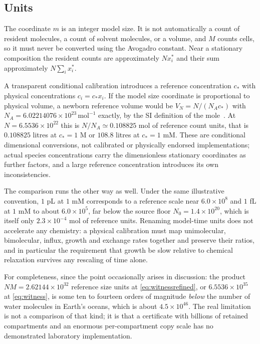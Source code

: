 \documentclass[11pt,a4paper]{article}
\theoremstyle{plain}
\theoremstyle{definition}
\theoremstyle{remark}
\begin{document}
\subsection{Units}\label{sec:units}

The coordinate $m$ is an integer model size. It is not automatically a count of
resident molecules, a count of solvent molecules, or a volume, and $M$ counts
cells, so it must never be converted using the Avogadro constant. Near a
stationary composition the resident counts are approximately $Nx_i^*$ and their
sum approximately $N\sum_ix_i^*$.

A transparent conditional calibration introduces a reference concentration
$c_*$ with physical concentrations $c_i=c_*x_i$. If the model size coordinate
is proportional to physical volume, a newborn reference volume would be
$V_N=N/(N_Ac_*)$ with $N_A=6.02214076\times10^{23}\,\mathrm{mol}^{-1}$ exactly,
by the SI definition of the mole~\citep{bipm2019}. At $N=6.5536\times10^{22}$
this is $N/N_A\simeq0.108825$ mol of reference count units, that is $0.108825$
litres at $c_*=1$ M or $108.8$ litres at $c_*=1$ mM. These are conditional
dimensional conversions, not calibrated or physically endorsed
implementations; actual species concentrations carry the dimensionless
stationary coordinates as further factors, and a large reference concentration
introduces its own inconsistencies.

The comparison runs the other way as well. Under the same illustrative
convention, $1$ pL at $1$ mM corresponds to a reference scale near
$6.0\times10^{8}$ and $1$ fL at $1$ mM to about $6.0\times10^{5}$, far below the
source floor $N_0=1.4\times10^{20}$, which is itself only
$2.3\times10^{-4}$ mol of reference units. Renaming model-time units does not
accelerate any chemistry: a physical calibration must map unimolecular,
bimolecular, influx, growth and exchange rates together and preserve their
ratios, and in particular the requirement that growth be slow relative to
chemical relaxation survives any rescaling of time alone.

For completeness, since the point occasionally arises in discussion: the
product $NM=2.62144\times10^{32}$ reference size units at
\eqref{eq:witnessrefined}, or $6.5536\times10^{35}$ at \eqref{eq:witness}, is
some ten to fourteen orders of magnitude \emph{below} the number of water
molecules in Earth's oceans, which is about $4.5\times10^{46}$. The real
limitation is not a comparison of that kind; it is that a certificate with
billions of retained compartments and an enormous per-compartment copy scale
has no demonstrated laboratory implementation.
\end{document}

